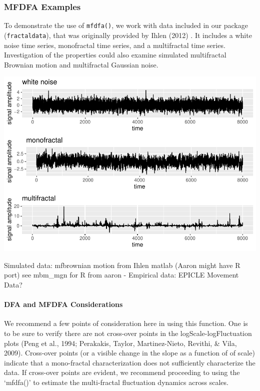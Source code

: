 \documentclass[
  english,
  man]{apa6}
\let\oldparagraph\paragraph
\renewcommand{\paragraph}[1]{\oldparagraph{#1}\mbox{}}
\begin{document}
\hypertarget{mfdfa-examples}{%
\subsubsection{MFDFA Examples}\label{mfdfa-examples}}

To demonstrate the use of \texttt{mfdfa()}, we work with data included in our
package (\texttt{fractaldata}), that was originally provided by
Ihlen (2012) . It includes a white noise
time series, monofractal time series, and a multifractal time series.
Investigation of the properties could also examine simulated
multifractal Brownian motion and multifractal Gaussian noise.

\includegraphics{fractal_regression_paper_brm_files/figure-latex/unnamed-chunk-3-1.pdf}

Simulated data: mfbrownian motion from Ihlen matlab (Aaron might have R
port) see mbm\_mgn for R from aaron - Empirical data: EPICLE Movement
Data?

\hypertarget{dfa-and-mfdfa-considerations}{%
\paragraph{DFA and MFDFA Considerations}\label{dfa-and-mfdfa-considerations}}

We recommend a few points of consideration here in using this function.
One is to be sure to verify there are not cross-over points in the
logScale-logFluctuation plots (Peng et al., 1994; Perakakis, Taylor, Martinez-Nieto, Revithi, \& Vila, 2009). Cross-over points (or a visible change in the slope as
a function of of scale) indicate that a mono-fractal characterization
does not sufficiently characterize the data. If cross-over points are
evident, we recommend proceeding to using the `mfdfa()' to estimate the
multi-fractal fluctuation dynamics across scales.
\end{document}
